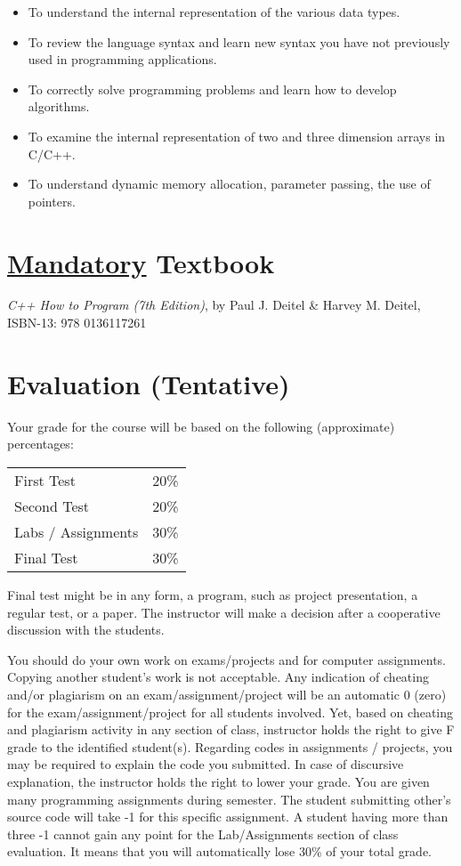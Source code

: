 \documentclass[11pt]{article}
\begin{document}
\begin{itemize}
\item To understand the internal representation of the various data types.
\item To review the language syntax and learn new syntax you have not previously used in programming applications.
\item To correctly solve programming problems and learn how to develop algorithms.
\item To examine the internal representation of two and three dimension arrays in C/C++.
\item To understand dynamic memory allocation, parameter passing, the use of pointers.
\end{itemize}
\section*{\uline{Mandatory} Textbook}
\label{sec-5}
\emph{C++ How to Program (7th Edition)}, by Paul J. Deitel \& Harvey M. Deitel, ISBN-13: 978 0136117261


\section*{Evaluation (Tentative)}
\label{sec-6}
Your grade for the course will be based on the following (approximate) percentages:

\begin{center}
\begin{tabular}{ll}
First Test & 20\%\\
Second Test & 20\%\\
Labs / Assignments & 30\%\\
Final Test & 30\%\\
\end{tabular}
\end{center}

Final test might be in any form, a program, such as project
presentation, a regular test, or a paper. The instructor will make a
decision after a cooperative discussion with the students.

You should do your own work on exams/projects and for computer
assignments. Copying another student’s work is not acceptable. Any
indication of cheating and/or plagiarism on an exam/assignment/project
will be an automatic 0 (zero) for the exam/assignment/project for all
students involved. Yet, based on cheating and plagiarism activity in
any section of class, instructor holds the right to give F grade to
the identified student(s). Regarding codes in assignments / projects,
you may be required to explain the code you submitted. In case of
discursive explanation, the instructor holds the right to lower your
grade. You are given many programming assignments during semester. The
student submitting other’s source code will take -1 for this specific
assignment. A student having more than three -1 cannot gain any point
for the Lab/Assignments section of class evaluation. It means that you
will automatically lose 30\% of your total grade.
\end{document}
